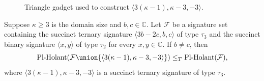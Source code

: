 \documentclass[11pt]{article}
\newcommand{\PlHolant}{\operatorname{Pl-Holant}}
\def\borderColor{blue!60}
\def\scale{0.6}
\def\nodeDist{1.4cm}
\begin{document}
\begin{figure}[t]
 \centering
 \caption{Triangle gadget used to construct $\langle 3 (\kappa - 1), \kappa - 3, -3 \rangle$.}
 \label{fig:gadget:ternary:triangle}
\end{figure}

\begin{lemma} \label{lem:ternary:fixed_point}
 Suppose $\kappa \ge 3$ is the domain size and $b,c \in \mathbb{C}$.
 Let $\mathcal{F}$ be a signature set containing the succinct ternary signature $\langle 3 b - 2 c, b, c \rangle$ of type $\tau_3$
 and the succinct binary signature $\langle x,y \rangle$ of type $\tau_2$ for every $x,y \in \mathbb{C}$.
 If $b \ne c$,
 then
 \[
  \PlHolant(\mathcal{F} \union \{\langle 3 (\kappa - 1), \kappa - 3, -3 \rangle\}) \le_T \PlHolant(\mathcal{F}),
 \]
 where $\langle 3 (\kappa - 1), \kappa - 3, -3 \rangle$ is a succinct ternary signature of type $\tau_3$.
\end{lemma}
\end{document}
